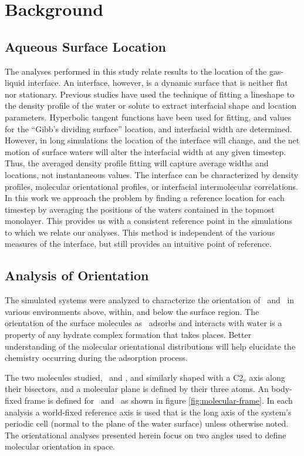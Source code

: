 \section{Background}

\subsection {Aqueous Surface Location}

	The analyses performed in this study relate results to the location of the gas-liquid interface. An interface, however, is a dynamic surface that is neither flat nor stationary. Previous studies have used the technique of fitting a lineshape to the density profile of the water or solute to extract interfacial shape and location parameters.\cite{Shamay2010,Wick2006c,Chowdhary2006} Hyperbolic tangent functions have been used for fitting, and values for the ``Gibb's dividing surface'' location, and interfacial width are determined.\cite{Matsumoto1988} However, in long simulations the location of the interface will change, and the net motion of surface waters will alter the interfacial width at any given timestep. Thus, the averaged density profile fitting will capture average widths and locations, not instantaneous values. The interface can be characterized by density profiles, molecular orientational profiles, or interfacial intermolecular correlations. In this work we approach the problem by finding a reference location for each timestep by averaging the positions of the waters contained in the topmost monolayer. This provides us with a consistent reference point in the simulations to which we relate our analyses. This method is independent of the various measures of the interface, but still provides an intuitive point of reference.

\subsection{Analysis of Orientation}

	The simulated systems were analyzed to characterize the orientation of \wat~and \suldiox~in various environments above, within, and below the surface region. The orientation of the surface molecules as \suldiox~adsorbs and interacts with water is a property of any hydrate complex formation that takes places. Better understanding of the molecular orientational distributions will help elucidate the chemistry occurring during the adsorption process.

	The two molecules studied, \wat~and \suldiox, and similarly shaped with a C2$_v$ axis along their bisectors, and a molecular plane is defined by their three atoms. An body-fixed frame is defined for \wat~and \suldiox~as shown in figure \ref{fig:molecular-frame}. In each analysis a world-fixed reference axis is used that is the long axis of the system's periodic cell (normal to the plane of the water surface) unless otherwise noted. The orientational analyses presented herein focus on two angles used to define molecular orientation in space. 
	
